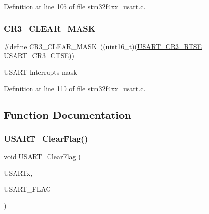 Definition at line 106 of file stm32f4xx\+\_\+usart.\+c.

\mbox{\label{group___u_s_a_r_t_ga5c882571db73abc5d1837368a1cb0a64}} 
\subsubsection{\texorpdfstring{C\+R3\+\_\+\+C\+L\+E\+A\+R\+\_\+\+M\+A\+SK}{CR3\_CLEAR\_MASK}}
{\footnotesize\ttfamily \#define C\+R3\+\_\+\+C\+L\+E\+A\+R\+\_\+\+M\+A\+SK~((uint16\+\_\+t)(\hyperlink{group___peripheral___registers___bits___definition_ga7c5d6fcd84a4728cda578a0339b4cac2}{U\+S\+A\+R\+T\+\_\+\+C\+R3\+\_\+\+R\+T\+SE} $\vert$ \hyperlink{group___peripheral___registers___bits___definition_gaa125f026b1ca2d76eab48b191baed265}{U\+S\+A\+R\+T\+\_\+\+C\+R3\+\_\+\+C\+T\+SE}))}

U\+S\+A\+RT Interrupts mask 

Definition at line 110 of file stm32f4xx\+\_\+usart.\+c.



\subsection{Function Documentation}
\mbox{\label{group___u_s_a_r_t_gad962e148fc466ae1b45b288f6c91d966}} 
\subsubsection{\texorpdfstring{U\+S\+A\+R\+T\+\_\+\+Clear\+Flag()}{USART\_ClearFlag()}}
{\footnotesize\ttfamily void U\+S\+A\+R\+T\+\_\+\+Clear\+Flag (\begin{DoxyParamCaption}\item[{\hyperlink{struct_u_s_a_r_t___type_def}{U\+S\+A\+R\+T\+\_\+\+Type\+Def} $\ast$}]{U\+S\+A\+R\+Tx,  }\item[{uint16\+\_\+t}]{U\+S\+A\+R\+T\+\_\+\+F\+L\+AG }\end{DoxyParamCaption})}



